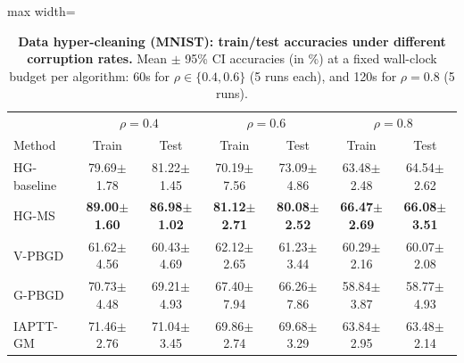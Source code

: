 \documentclass{article}
\theoremstyle{normaltheorem}
\begin{document}
\begin{table}[t]
  \centering
  \caption[\textbf{Data hyper-cleaning (MNIST): train/test accuracies.}]{%
  \textbf{Data hyper-cleaning (MNIST): train/test accuracies under different corruption rates.}
  Mean $\pm$ 95\% CI accuracies (in \%) at a fixed wall-clock budget per algorithm:
  60s for $\rho\in\{0.4,0.6\}$ (5 runs each), and 120s for $\rho=0.8$ (5 runs).}
  \label{tab:dhc-acc}
  \begin{adjustbox}{max width=\linewidth}
  \begin{tabular}{lcccccc}
    \toprule
    & \multicolumn{2}{c}{$\rho=0.4$} & \multicolumn{2}{c}{$\rho=0.6$} & \multicolumn{2}{c}{$\rho=0.8$} \\
    Method & Train & Test & Train & Test & Train & Test \\
    \midrule
    HG-baseline & 79.69$\pm$1.78 & 81.22$\pm$1.45 & 70.19$\pm$7.56 & 73.09$\pm$4.86 & 63.48$\pm$2.48 & 64.54$\pm$2.62 \\
    HG-MS       & \textbf{89.00$\pm$1.60} & \textbf{86.98$\pm$1.02} & \textbf{81.12$\pm$2.71} & \textbf{80.08$\pm$2.52} & \textbf{66.47$\pm$2.69} & \textbf{66.08$\pm$3.51} \\
    V-PBGD      & 61.62$\pm$4.56 & 60.43$\pm$4.69 & 62.12$\pm$2.65 & 61.23$\pm$3.44 & 60.29$\pm$2.16 & 60.07$\pm$2.08 \\
    G-PBGD      & 70.73$\pm$4.48 & 69.21$\pm$4.93 & 67.40$\pm$7.94 & 66.26$\pm$7.86 & 58.84$\pm$3.87 & 58.77$\pm$4.93 \\
    IAPTT-GM    & 71.46$\pm$2.76 & 71.04$\pm$3.45 & 69.86$\pm$2.74 & 69.68$\pm$3.29 & 63.84$\pm$2.95 & 63.48$\pm$2.14 \\
    \bottomrule
  \end{tabular}
  \end{adjustbox}
\end{table}
\end{document}
